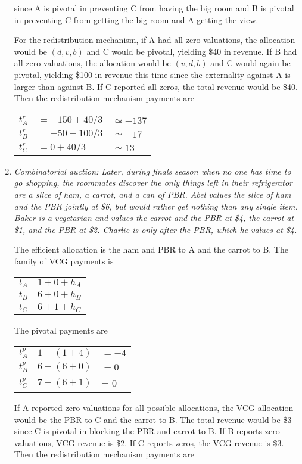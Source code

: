 \documentclass[letter, 10pt]{article}
\theoremstyle{definition}
\begin{document}
\begin{spacing}{1.1}
\begin{enumerate}
  since A is pivotal in preventing C from having the big room and B is
  pivotal in preventing C from getting the big room and A getting the
  view.

  For the redistribution mechanism, if A had all zero valuations, the
  allocation would be $(d, v, b)$ and C would be pivotal, yielding \$40 in
  revenue. If B had all zero valuations, the allocation would be $(v, d,
  b)$ and C would again be pivotal, yielding \$100 in revenue this time
  since the externality against A is larger than against B. If C reported
  all zeros, the total revenue would be \$40. Then the redistribution
  mechanism payments are

  \begin{tabular}{lll}
    $t_A^r$ & $= -150 + 40/3$ & $\simeq -137$ \\
    $t_B^r$ & $= -50 + 100/3$ & $\simeq -17$ \\
    $t_C^r$ & $= 0 + 40/3$ & $\simeq 13$
  \end{tabular}

\item \textit{Combinatorial auction: Later, during finals season when no
    one has time to go shopping, the roommates discover the only things
    left in their refrigerator are a slice of ham, a carrot, and a can of
    PBR. Abel values the slice of ham and the PBR jointly at \$6, but
    would rather get nothing than any single item. Baker is a vegetarian
    and values the carrot and the PBR at \$4, the carrot at \$1, and the
    PBR at \$2. Charlie is only after the PBR, which he values at \$4.}

  The efficient allocation is the ham and PBR to A and the carrot to
  B. The family of VCG payments is

  \begin{tabular}{ll}
    $t_A$ & $1 + 0 + h_A$ \\
    $t_B$ & $6 + 0 + h_B$ \\
    $t_C$ & $6 + 1 + h_C$
  \end{tabular}

  The pivotal payments are

  \begin{tabular}{lll}
    $t_A^p$ & $1 - (1 + 4)$ & $= -4$ \\
    $t_B^p$ & $6 - (6 + 0)$ & $= 0$ \\
    $t_C^p$ & $7 - (6 + 1)$ &= 0
  \end{tabular}

  If A reported zero valuations for all possible allocations, the VCG
  allocation would be the PBR to C and the carrot to B. The total revenue
  would be \$3 since C is pivotal in blocking the PBR and carrot to
  B. If B reports zero valuations, VCG revenue is \$2. If C reports zeros,
  the VCG revenue is \$3. Then the redistribution mechanism payments are


\end{enumerate}
\end{spacing}
\end{document}
